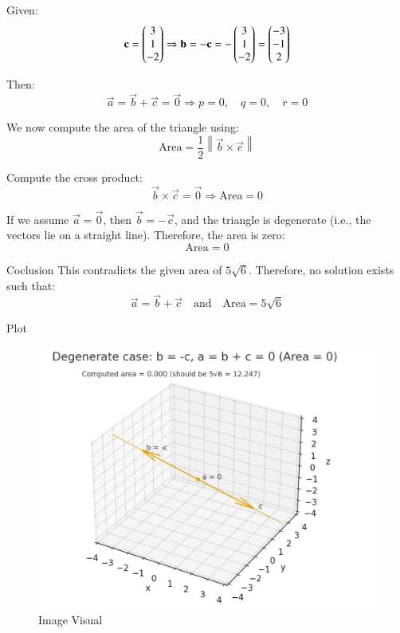 \documentclass{beamer}
\begin{document}
\begin{frame}
Given:
\begin{equation}
\mathbf{c} = \begin{pmatrix}3 \\ 1 \\ -2\end{pmatrix} 
\Rightarrow \mathbf{b} = -\mathbf{c} = -\begin{pmatrix}3 \\ 1 \\ -2\end{pmatrix}
= \begin{pmatrix}-3 \\ -1 \\ 2\end{pmatrix}
\end{equation}

Then:
\begin{equation}
\vec{a} = \vec{b} + \vec{c} = \vec{0}
\Rightarrow p = 0,\quad q = 0,\quad r = 0
\end{equation}

We now compute the area of the triangle using:
\begin{equation}
\text{Area} = \frac{1}{2} \left\| \vec{b} \times \vec{c} \right\|
\end{equation}

Compute the cross product:
\begin{equation}
\vec{b} \times \vec{c} = \vec{0} \Rightarrow \text{Area} = 0
\end{equation}

If we assume $\vec{a} = \vec{0}$, then $\vec{b} = -\vec{c}$, and the triangle is degenerate (i.e., the vectors lie on a straight line). Therefore, the area is zero:
\begin{equation}
\boxed{\text{Area} = 0}
\end{equation}
\end{frame}
\begin{frame}{Coclusion}
This contradicts the given area of $5\sqrt{6}$. Therefore, no solution exists such that:
\begin{equation}
\vec{a} = \vec{b} + \vec{c} \quad \text{and} \quad \text{Area} = 5\sqrt{6}
\end{equation}
\end{frame}
\begin{frame}{Plot}
   \begin{figure}[H]
    \centering
    \includegraphics[width=0.75\linewidth]{figs/Screenshot 2025-09-13 191422.png}
    \caption{Image Visual}
    \label{fig:figs/Screenshot 2025-09-13 191422.png}
\end{figure}

\end{frame}
\end{document}
